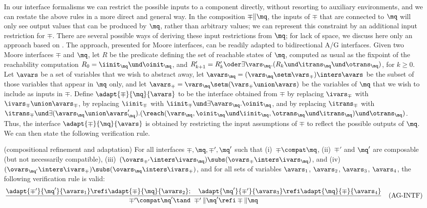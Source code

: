 In our interface formalisms we can restrict the possible inputs to a
component directly, without resorting to auxiliary environments, and
we can restate the above rules in a more direct and general way.
In the composition $\mp \| \mq$, the inputs of $\mp$ that are connected
to $\mq$ will only see output values that can be produced by $\mq$,
rather than arbitrary values; 
we can represent this constraint by an additional input restriction
for $\mp$. 
There are several possible ways of deriving these input restrictions 
from $\mq$;
for lack of space, we discuss here only 
an approach based on \cite{concur99freddy}. 
The approach, presented for Moore interfaces, can be readily adapted
to bidirectional A/G interfaces. 
Given two Moore interfaces $\mp$ and $\mq$, let $R$ be the predicate
defining the set of reachable states of $\mq$, computed as usual as
the fixpoint of the reachability computation $R_0 = \iinit_\mq \und
\oinit_\mq$, and $R'_{k+1} = R'_k \oder \exists \vars_\mq .  (R_k \und
\itrans_\mq \und \otrans_\mq)$, for $k \geq 0$.
%
Let $\avars$ be a set of variables that we wish to abstract away, 
let $\avars_\mq = (\vars_\mq \setm \vars_\mp) \inters \avars$
be the subset of those variables that appear in $\mq$ only, 
and let $\avars_\mp = \vars_\mq \setm (\vars_\mp \union \avars)$
be the variables of $\mq$ that we wish to include as inputs in $\mp$. 
%
Define $\adapt{\mp}{\mq}{\avars}$  to be the interface obtained
from $\mp$ by replacing $\ivars_\mp$ with 
$\ivars_\mp \union \avars_\mp$, 
%
by replacing $\iinit_\mp$ with 
$\iinit_\mp \und \exists \avars_\mq . \oinit_\mq$, 
%
and by replacing $\itrans_\mp$ with 
$\itrans_\mp \und \exists (\avars_\mq \union \avars_\mq') . 
(\reach(\vars_\mq,\oinit_\mq \und \iinit_\mq,\otrans_\mq \und
\itrans_\mq) \und \otrans_\mq)$.
%
Thus, the interface $\adapt{\mp}{\mq}{\avars}$ is obtained by
restricting the input assumptions of $\mp$ to reflect the possible
outputs of $\mq$. 
We can then state the following verification rule. 

\begin{theo}{(compositional refinement and adaptation)} 
\label{theo-comp-refi} 
For all interfaces $\mp, \mq, \mp', \mq'$ such that 
(i)~$\mp \compat \mq$, 
(ii)~$\mp'$ and $\mq'$ are composable (but not necessarily
compatible),
(iii)~$(\ovars_{\mp'} \inters \ivars_\mq) \subs (\ovars_\mp \inters \ivars_\mq)$,
and 
(iv)~$(\ovars_{\mq'} \inters \ivars_\mp) \subs (\ovars_\mq \inters \ivars_\mp)$,
and for all sets of variables $\avars_1$, $\avars_2$, $\avars_3$,
$\avars_4$, the following verification rule is valid: 
\[
  \frac{\adapt{\mp'}{\mq'}{\avars_1} \refi \adapt{\mp}{\mq}{\avars_2}; \hspace{1em} 
        \adapt{\mq'}{\mp'}{\avars_3} \refi \adapt{\mq}{\mp}{\avars_4}}{
	\mp' \compat \mq' \tand \ 
	\mp' \| \mq' \refi \mp \| \mq} \hspace{1em} (\mbox{\rm AG-INTF})
\]
\end{theo}

